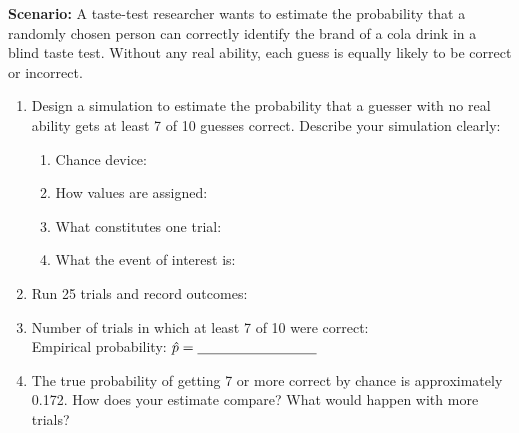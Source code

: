 \documentclass[10pt]{article}
\begin{document}
\vspace{0.1in}

\begin{tcolorbox}[colback=sky, colframe=navy, boxrule=1pt, arc=2mm,
    left=4mm, right=4mm, top=3mm, bottom=3mm,
    title={\bfseries Tier E \enspace Extension --- Design Your Own}]
\small

\textbf{Scenario:} A taste-test researcher wants to estimate the probability that a
randomly chosen person can correctly identify the brand of a cola drink in a blind
taste test. Without any real ability, each guess is equally likely to be correct or
incorrect.

\begin{enumerate}[leftmargin=1.5em, itemsep=8pt]
  \item Design a simulation to estimate the probability that a guesser with no real
        ability gets at least 7 of 10 guesses correct. Describe your simulation clearly:
        \begin{enumerate}[label=(\alph*), itemsep=4pt]
          \item Chance device: \writeline
          \item How values are assigned: \writeline
          \item What constitutes one trial: \writeline
          \item What the event of interest is: \writeline
        \end{enumerate}
  \item Run 25 trials and record outcomes:
        \vspace{20pt}
  \item Number of trials in which at least 7 of 10 were correct: \blank{2cm}\\
        Empirical probability: $\hat{p} = \blank{3cm}$
  \item The true probability of getting 7 or more correct by chance is approximately
        0.172. How does your estimate compare? What would happen with more trials?\\
        \writeline\writeline
\end{enumerate}

\end{tcolorbox}
\end{document}

